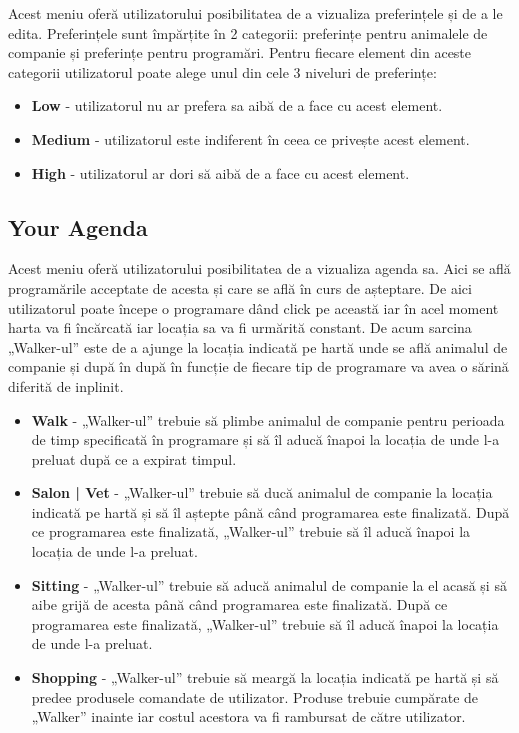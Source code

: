 Acest meniu oferă utilizatorului posibilitatea de a vizualiza preferințele și de a le edita. Preferințele sunt împărțite în 2 categorii: preferințe pentru animalele de companie și preferințe pentru programări. Pentru fiecare element din aceste categorii utilizatorul poate alege unul din cele 3 niveluri de preferințe:

\begin{itemize}
    \item \textbf{Low} - utilizatorul nu ar prefera sa aibă de a face cu acest element.
    \item \textbf{Medium} - utilizatorul este indiferent în ceea ce privește acest element.
    \item \textbf{High} - utilizatorul ar dori să aibă de a face cu acest element.
\end{itemize}

\newpage

\subsection{Your Agenda}

Acest meniu oferă utilizatorului posibilitatea de a vizualiza agenda sa. Aici se află programările acceptate de acesta și care se află în curs de așteptare. De aici utilizatorul poate începe o programare dând click pe această iar în acel moment harta va fi încărcată iar locația sa va fi urmărită constant. De acum sarcina „Walker-ul” este de a ajunge la locația indicată pe hartă unde se află animalul de companie și după în după în funcție de fiecare tip de programare va avea o sărină diferită de inplinit. 


\begin{itemize}
    \item \textbf{Walk} - „Walker-ul” trebuie să plimbe animalul de companie pentru perioada de timp specificată în programare și să îl aducă înapoi la locația de unde l-a preluat după ce a expirat timpul.
    \item \textbf{Salon | Vet} - „Walker-ul” trebuie să ducă animalul de companie la locația indicată pe hartă și să îl aștepte până când programarea este finalizată. După ce programarea este finalizată, „Walker-ul” trebuie să îl aducă înapoi la locația de unde l-a preluat. 
    \item \textbf{Sitting} - „Walker-ul” trebuie să aducă animalul de companie la el acasă și să aibe grijă de acesta până când programarea este finalizată. După ce programarea este finalizată, „Walker-ul” trebuie să îl aducă înapoi la locația de unde l-a preluat.
    \item \textbf{Shopping} - „Walker-ul” trebuie să meargă la locația indicată pe hartă și să predee produsele comandate de utilizator. Produse trebuie cumpărate de „Walker” inainte iar costul acestora va fi rambursat de către utilizator.
\end{itemize}

